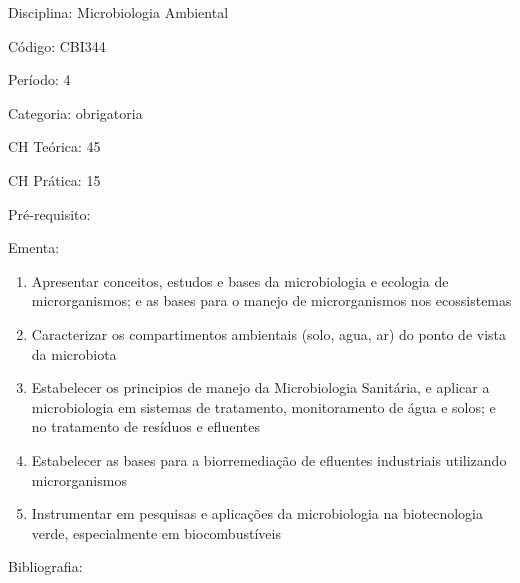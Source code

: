 \documentclass[12pt,a4paper,twoside]{report}
\begin{document}
Disciplina: Microbiologia Ambiental

Código: CBI344

Período: 4

Categoria: obrigatoria

CH Teórica: 45

CH Prática: 15




Pré-requisito:
\begin{enumerate}
\end{enumerate}

Ementa:
\begin{enumerate}
\item Apresentar conceitos, estudos e bases da microbiologia e ecologia de microrganismos; e as bases para o manejo de microrganismos nos ecossistemas
\item Caracterizar os compartimentos ambientais (solo, agua, ar) do ponto de vista da microbiota
\item Estabelecer os principios de manejo da Microbiologia Sanitária, e aplicar a microbiologia em sistemas de tratamento, monitoramento de água e solos; e no tratamento de resíduos e efluentes
\item Estabelecer as bases para a biorremediação de efluentes industriais utilizando microrganismos
\item Instrumentar em pesquisas e aplicações da microbiologia na biotecnologia verde, especialmente em biocombustíveis
\end{enumerate}



Bibliografia:
\end{document}
